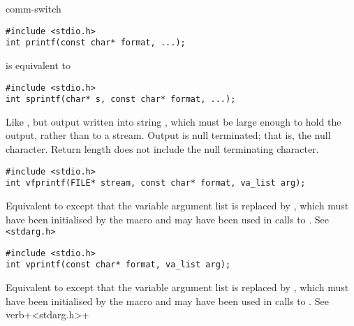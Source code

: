 \begin{Ventry2}{comm-switch  }
\item[printf]
\label{item:printf}
\begin{production}
\begin{verbatim}
#include <stdio.h>
int printf(const char* format, ...);
\end{verbatim}
\end{production}

      is equivalent to 

\item[sprintf]
\label{item:sprintf}
\begin{production}
\begin{verbatim}
#include <stdio.h>
int sprintf(char* s, const char* format, ...);
\end{verbatim}
\end{production}

     Like , but output written into string , which must be
     large enough to hold the output, rather than to a stream. Output
     is null terminated; that is, the null character.  Return length
     does not include the null terminating character.

\item[vfprintf]
\label{item:vfprintf}
\begin{production}
\begin{verbatim}
#include <stdio.h>
int vfprintf(FILE* stream, const char* format, va_list arg);
\end{verbatim}
\end{production}

     Equivalent to  except that the variable argument list
     is replaced by , which must have been initialised by the
      macro and may have been used in calls to
     . See \verb+<stdarg.h>+

\item[vprintf]
\label{item:vprintf}
\begin{production}
\begin{verbatim}
#include <stdio.h>
int vprintf(const char* format, va_list arg);
\end{verbatim}
\end{production}

     Equivalent to  except that the variable argument list is replaced by
     , which must have been initialised by the  macro and may have
     been used in calls to . See verb+<stdarg.h>+


\end{Ventry2}
